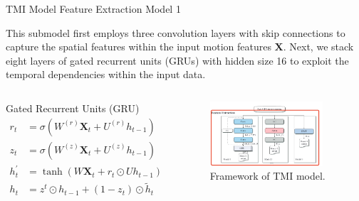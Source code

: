 \documentclass[UTF8]{beamer}
\begin{document}
\begin{frame}
{TMI Model}
{Feature Extraction}
{Model 1}

This submodel first employs three convolution layers with skip connections to capture the spatial features within the input motion features $\mathbf{X}$. Next, we stack eight layers of gated recurrent units (GRUs) with hidden size 16 to exploit the temporal dependencies within the input data.

\begin{columns}
\begin{block}{Gated Recurrent Units (GRU)}
$\begin{aligned} r_t &=\sigma\left(W^{(r)} \mathbf{X}_t+U^{(r)} h_{t-1}\right) \\ z_t &=\sigma\left(W^{(z)} \mathbf{X}_t+U^{(z)} h_{t-1}\right) \\ h_t^{\prime} &=\tanh \left(W \mathbf{X}_t+r_t \odot U h_{t-1}\right) \\ h_t &=z^t \odot h_{t-1}+\left(1-z_t\right) \odot \tilde{h}_t \end{aligned}$
\end{block}
\begin{figure}[ht]
\centering
\includegraphics[height=0.67\textwidth]{images/feature}
\caption{Framework of TMI model.} 
\end{figure}
\end{columns}
\end{frame}
\end{document}

